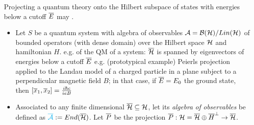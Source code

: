 {    %
            
            
    
    
    
    \cite{FioreTheCase2020} Projecting a quantum theory onto the Hilbert subspace of states with energies below a cutoff $\overline{E}$ may . 
    
        \begin{itemize}
            
        \item Let $S$ be a quantum system with algebra of observables $\mathcal A = \mathcal B(\mathcal H)/Lin(\mathcal H)$ of bounded operators (with dense domain) over the Hilbert space $\mathcal H$ and hamiltonian $H$. e.g.  of the QM of a system: $\overline{\mathcal H}$ is spanned by eigenvectors of energies below a cutoff $\overline{E}$ e.g. (prototypical example) Peierls projection applied to the Landau model of a charged particle in a plane subject to a perpendicular magnetic field $B$; in that case, if $\overline{E} = E_0$ the ground state, then $[\overline{x}_1, \overline{x}_2] = \frac{i\hbar c}{ie B}$
        
        \item Associated to any finite dimensional $\overline{\mathcal H} \subseteq \mathcal H$, let its \emph{algebra of observables} be defined as $\textcolor{cyan}{\overline{\mathcal A}} := End(\overline{\mathcal H})$. Let $\overline{P}$ be the projection $\overline{P} : \mathcal H = \overline{\mathcal H} \oplus \overline{H}^\perp \to \overline{\mathcal H}$.
        

\end{itemize}}
